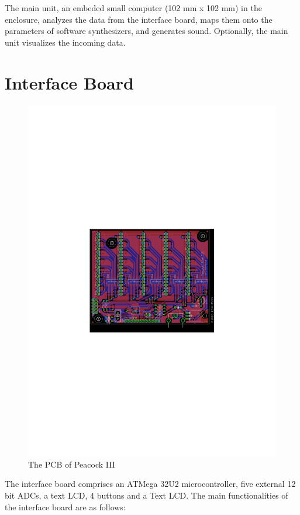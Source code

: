 \documentclass{nime-alternate}
\begin{document}
The main unit, an embeded small computer (102 mm x 102 mm) in the enclosure, analyzes the data from the interface board, maps them onto the parameters of software synthesizers, and generates sound. Optionally, the main unit visualizes the incoming data.

\section{Interface Board} %

\begin{figure}[htbp]
       \begin{center}
              \includegraphics[width=0.9\columnwidth]{board}
       \end{center}
       \caption{The PCB of Peacock III}
       \label{fig:board}
\end{figure}

The interface board comprises an ATMega 32U2 microcontroller\cite{atmel:avr}, five external 12 bit ADCs, a text LCD, 4 buttons and a Text LCD. The main functionalities of the interface board are as follows:
\end{document}

